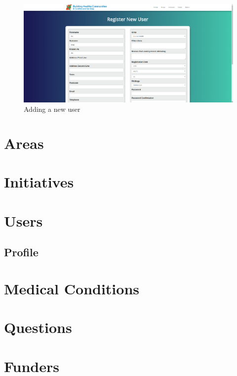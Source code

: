 \documentclass{bhcguides}
\begin{document}
\begin{figure}[h!]
 \centerline{\includegraphics[width=\textwidth, height=\textheight, keepaspectratio]{newuser.png}}
 \caption{Adding a new user}
 \label{fig:newUser}
\end{figure}

\section{Areas}
\label{sec:areas}

\section{Initiatives}
\label{sec:initiatives}

\section{Users}
\label{sec:users}

\subsection{Profile}
\label{ssec:profile}

\section{Medical Conditions}
\label{sec:medical}

\section{Questions}
\label{sec:questions}

\section{Funders}
\label{sec:funders}
\end{document}
